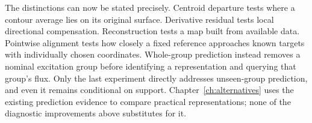 The distinctions can now be stated precisely. Centroid departure tests where a contour average lies on its original surface. Derivative residual tests local directional compensation. Reconstruction tests a map built from available data. Pointwise alignment tests how closely a fixed reference approaches known targets with individually chosen coordinates. Whole-group prediction instead removes a nominal excitation group before identifying a representation and querying that group's flux. Only the last experiment directly addresses unseen-group prediction, and even it remains conditional on support. Chapter~\ref{ch:alternatives} uses the existing prediction evidence to compare practical representations; none of the diagnostic improvements above substitutes for it.
